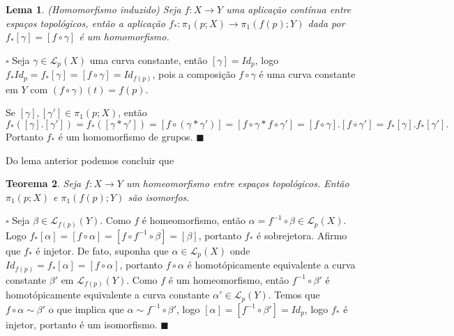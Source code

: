 \documentclass[12pt]{book}
\newtheorem{teorema}{Teorema}[section]
\newtheorem{lema}[teorema]{Lema}
\newenvironment{prova}[1]{$\square$ #1}{\hfill$\blacksquare$}
\newcommand{\caminhospontobasegeral}[2]{\mathcal{L}_{#1}(#2)}
\newcommand{\classe}[1]{[#1]}
\newcommand{\grupofundamentalpontobase}[2]{\pi_{1}(#1; #2)}
\begin{document}
		\begin{lema}
			(Homomorfismo induzido) Seja $f:X\to Y$ uma aplicação contínua entre espaços topológicos, então a aplicação $f_{*}:\grupofundamentalpontobase{p}{X} \to \grupofundamentalpontobase{f(p)}{Y}$ dada por $f_{*}\classe{\gamma} = \classe{f\circ\gamma}$ é um homomorfismo.
		\end{lema}
		\begin{prova}
			Seja $\gamma \in \caminhospontobasegeral{p}{X}$ uma curva constante, então $\classe{\gamma} = Id_{p}$, logo $f_{*}Id_{p} = f_{*}\classe{\gamma} = \classe{f\circ\gamma} = Id_{f(p)}$, pois a composição $f\circ\gamma$ é uma curva constante em $Y$ com $(f\circ\gamma)(t) = f(p)$.
			
			Se $\classe{\gamma}, \classe{\gamma'}\in \grupofundamentalpontobase{p}{X}$, então 
			$$
			f_{*}(\classe{\gamma}.\classe{\gamma'}) = f_{*}(\classe{\gamma*\gamma'}) = \classe{f\circ(\gamma*\gamma')} = \classe{f\circ\gamma*f\circ\gamma'} =
			\classe{f\circ\gamma}.\classe{f\circ\gamma'}=	f_{*}\classe{\gamma}.f_{*}\classe{\gamma'}.
			$$
			Portanto $f_{*}$ é um homomorfismo de grupos.
		\end{prova}
		
		Do lema anterior podemos concluir que
		\begin{teorema}
			Seja $f:X\to Y$ um homeomorfismo entre espaços topológicos. Então $\grupofundamentalpontobase{p}{X}$ e $\grupofundamentalpontobase{f(p)}{Y}$ são isomorfos.
		\end{teorema}
		\begin{prova}
			Seja $\beta \in \caminhospontobasegeral{f(p)}{Y}$. Como $f$ é homeomorfismo, então $\alpha=f^{-1}\circ\beta \in \caminhospontobasegeral{p}{X}$. Logo $f_{*}\classe{\alpha} = \classe{f\circ\alpha} = \classe{f\circ f^{-1}\circ\beta}=\classe{\beta}$, portanto $f_{*}$ é sobrejetora. Afirmo que $f_{*}$ é injetor. De fato, suponha que $\alpha \in \caminhospontobasegeral{p}{X}$ onde $Id_{f(p)}=f_{*}\classe{\alpha} = \classe{f\circ \alpha} $, portanto $f\circ\alpha$ é homotópicamente equivalente a curva constante $\beta'$ em $\caminhospontobasegeral{f(p)}{Y}$. Como $f$ é um homeomorfismo, então $f^{-1}\circ\beta'$ é homotópicamente equivalente a curva constante $\alpha' \in \caminhospontobasegeral{p}{Y}$. Temos que $f\circ \alpha\sim \beta'$ o que implica que $\alpha \sim f^{-1}\circ \beta'$, logo $\classe{\alpha} = \classe{f^{-1}\circ \beta'} = Id_{p}$, logo $f_{*}$ é injetor, portanto é um isomorfismo.
		\end{prova}
		
\end{document}
